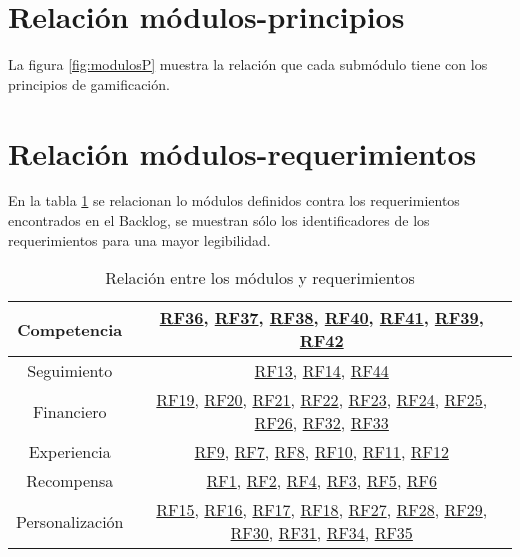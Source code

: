 
\clearpage
\section{Relación módulos-principios}
    La figura \ref{fig:modulosP} muestra la relación que cada submódulo tiene con los principios de gamificación.
    
    
\section{Relación módulos-requerimientos}

En la tabla \ref{tab:modreq} se relacionan lo módulos definidos contra los requerimientos encontrados en el Backlog, se muestran sólo los identificadores de los requerimientos para una mayor legibilidad.

\newcommand{\Refr}[1]{{\hyperlink{#1}{#1}}}
\begin{table}[h!]
    \centering
    \begin{tabular}{|c|c|}
    \hline
        Competencia & \Refr{RF36}, \Refr{RF37}, \Refr{RF38}, \Refr{RF40}, \Refr{RF41}, \Refr{RF39}, \Refr{RF42}\\
    \hline
        Seguimiento & \Refr{RF13}, \Refr{RF14}, \Refr{RF44}\\
    \hline
        Financiero & \Refr{RF19}, \Refr{RF20}, \Refr{RF21}, \Refr{RF22}, \Refr{RF23}, \Refr{RF24}, \Refr{RF25}, \Refr{RF26}, \Refr{RF32}, \Refr{RF33}\\
    \hline
        Experiencia & \Refr{RF9}, \Refr{RF7}, \Refr{RF8}, \Refr{RF10}, \Refr{RF11}, \Refr{RF12}\\
    \hline
        Recompensa & \Refr{RF1}, \Refr{RF2}, \Refr{RF4}, \Refr{RF3}, \Refr{RF5}, \Refr{RF6}\\
    \hline
        Personalización & \Refr{RF15}, \Refr{RF16}, \Refr{RF17}, \Refr{RF18}, \Refr{RF27}, \Refr{RF28}, \Refr{RF29}, \Refr{RF30}, \Refr{RF31}, \Refr{RF34}, \Refr{RF35}\\
    \hline
    \end{tabular}
    \caption{Relación entre los módulos y requerimientos}
    \label{tab:modreq}
\end{table}